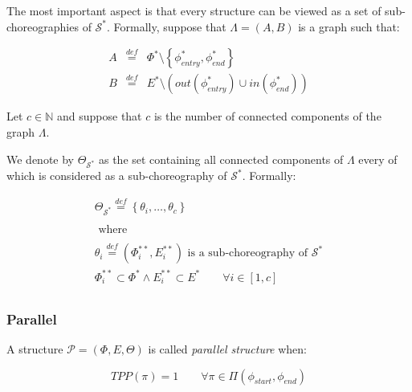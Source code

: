 \documentclass[12pt,a4paper]{report}
\newcommand*{\N}{\mathbb{N}}
\newcommand{\mathDef}{\overset{\textit{def}}{=}}
\theoremstyle{definition}
\begin{document}
The most important aspect is that every structure can be viewed as a set of sub-choreographies of $\mathcal{S}^*$. Formally, suppose that $\Lambda = (A,B)$ is a graph such that:

\begin{equation}
	\begin{array}{lll}
		A & \mathDef & \Phi^* \setminus \left\lbrace \phi_{entry}^*,\phi_{end}^* \right\rbrace   \\
		B & \mathDef & E^* \setminus \left( out\left(\phi_{entry}^*\right) \cup in\left(\phi_{end}^*\right) \right)
	\end{array}
\end{equation}

Let $c \in \N$ and suppose that $c$ is the number of connected components of the graph $\Lambda$.

We denote by $\Theta_{\mathcal{S}^*}$ as the set containing all connected components of $\Lambda$ every of which is considered as a sub-choreography of $\mathcal{S}^*$. Formally:

\begin{equation}
	\begin{array}{c}
		\Theta_{\mathcal{S}^*} \mathDef \left\lbrace \theta_i, \ldots ,\theta_c \right\rbrace \\\\
		\text{ where } \\\\
		
		\theta_i \mathDef (\Phi^{**}_i, E^{**}_i) \text{ is a sub-choreography of } \mathcal{S}^* \\
		\Phi^{**}_i \subset \Phi^{*} \wedge E^{**}_i \subset E^{*} \qquad \forall i \in \left[ 1, c \right] \\
	\end{array}
\end{equation} 

\subsubsection{Parallel}

A structure $\mathcal{P} = (\Phi,E,\Theta)$ is called \textit{parallel structure} when:

\begin{equation}
	TPP(\pi) = 1 \qquad \forall \pi \in \Pi(\phi_{start}, \phi_{end})
\end{equation}
\end{document}
